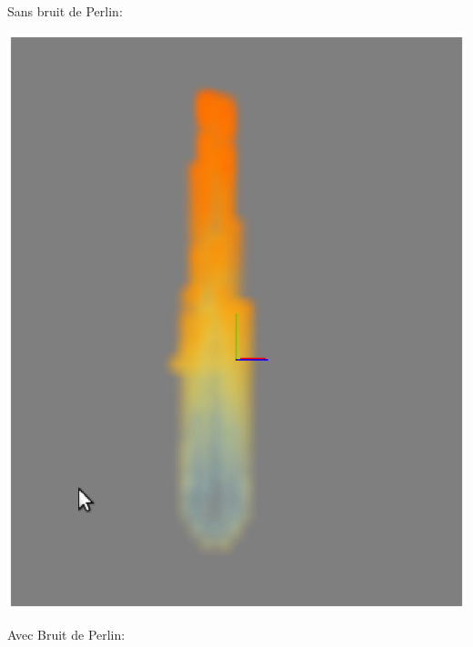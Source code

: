 \documentclass[a4paper,10pt]{article}
\begin{document}
Sans bruit de Perlin:\\
\begin{center}
\includegraphics[scale=0.3]{SansPerlin.ps}
\end{center}


Avec Bruit de Perlin:\\
\end{document}
